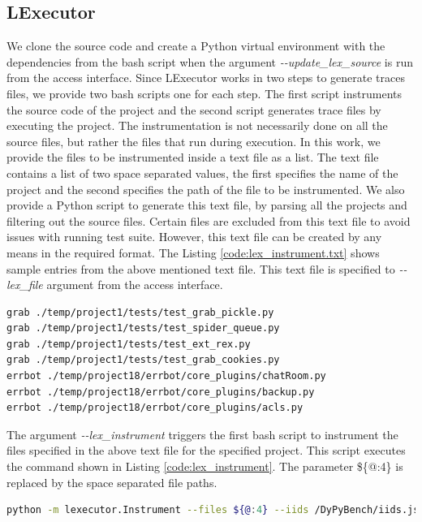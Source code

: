 \subsection{LExecutor}
We clone the source code and create a Python virtual environment with the dependencies from the bash script when the argument \textit{\--\--update\_lex\_source} is run from the access interface.
Since LExecutor works in two steps to generate traces files, we provide two bash scripts one for each step.
The first script instruments the source code of the project and the second script generates trace files by executing the project.  
The instrumentation is not necessarily done on all the source files, but rather the files that run during execution.
In this work, we provide the files to be instrumented inside a text file as a list.
The text file contains a list of two space separated values, the first specifies the name of the project and the second specifies the path of the file to be instrumented.
We also provide a Python script to generate this text file, by parsing all the projects and filtering out the source files.
Certain files are excluded from this text file to avoid issues with running test suite.
However, this text file can be created by any means in the required format.
The Listing \ref{code:lex_instrument.txt} shows sample entries from the above mentioned text file.
This text file is specified to \textit{\--\--lex\_file} argument from the access interface.

\newpage
\begin{lstlisting}[caption=lex\_instrument\_all.txt,label=code:lex_instrument.txt,language=Bash]
grab ./temp/project1/tests/test_grab_pickle.py
grab ./temp/project1/tests/test_spider_queue.py
grab ./temp/project1/tests/test_ext_rex.py
grab ./temp/project1/tests/test_grab_cookies.py
errbot ./temp/project18/errbot/core_plugins/chatRoom.py
errbot ./temp/project18/errbot/core_plugins/backup.py
errbot ./temp/project18/errbot/core_plugins/acls.py
\end{lstlisting}

The argument \textit{\--\--lex\_instrument} triggers the first bash script to instrument the files specified in the above text file for the specified project.
This script executes the command shown in Listing \ref{code:lex_instrument}.
The parameter \$\{@:4\} is replaced by the space separated file paths. 
\begin{lstlisting}[caption=LExecutor Instrumentation.,label=code:lex_instrument,language=Bash]
python -m lexecutor.Instrument --files ${@:4} --iids /DyPyBench/iids.json --validate
\end{lstlisting}

